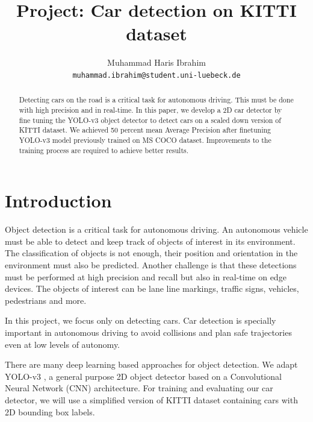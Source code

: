 \documentclass[10pt,twocolumn,letterpaper]{article}
\begin{document}
\title{Project: Car detection on KITTI dataset}

\author{Muhammad Haris Ibrahim\\
{\tt\small muhammad.ibrahim@student.uni-luebeck.de}
}

\maketitle

\begin{abstract}
  Detecting cars on the road is a critical task for autonomous driving. This must be done with high precision and in real-time. 
  In this paper, we develop a 2D car detector by fine tuning the YOLO-v3 object detector to detect cars on a scaled down version of KITTI dataset. 
  We achieved 50 percent mean Average Precision after finetuning YOLO-v3 model previously trained on MS COCO dataset. 
  Improvements to the training process are required to achieve better results.
\end{abstract}

\section{Introduction}
Object detection is a critical task for autonomous driving. An autonomous vehicle must be able to detect and keep track of objects of interest in its environment. The classification of objects is not enough, their position and orientation in the environment must also be predicted. 
Another challenge is that these detections must be performed at high precision and recall but also in real-time on edge devices. The objects of interest can be lane line markings, traffic signs, vehicles, pedestrians and more. 

In this project, we focus only on detecting cars. Car detection is specially important in autonomous driving to avoid collisions and plan safe trajectories even at low levels of autonomy.

There are many deep learning based approaches for object detection. We adapt YOLO-v3 \cite{redmon2018yolov3}, a general purpose 2D object detector based on a Convolutional Neural Network (CNN) architecture. For training and evaluating our car detector, we will use a simplified version of KITTI dataset containing cars with 2D bounding box labels. \cite{KITTI}
\end{document}
